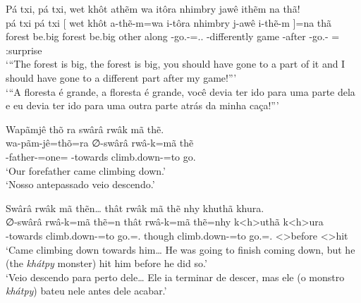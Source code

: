 \documentclass[output=paper,
modfonts,nonflat
]{langsci/langscibook}
\begin{document}
\ea  Pá txi, pá txi, wet khôt athẽm wa itôra nhimbry jawê ithẽm na thã! \\[.3em]
\gll pá     txi    pá     txi    [\footnotemark{} wet   khôt  a-thẽ-m=wa                               i-tôra             nhimbry j-awê    i-thẽ-m               ]=na        thã            \\
     forest be.big forest be.big {}               other along \Second-go.\Sg-\Nmlz{}=\AAnd.\Ds.\First{} \First-differently game    \E-after \First-go.\Sg-\Nmlz{} {}=\N\Fut{} \Intj:surprise \\
\glt `{}``The forest is big, the forest is big, you should have gone to a part of it and I should have gone to a different part after my game!''{}' \\
     `{}``A floresta é grande, a floresta é grande, você devia ter ido para uma parte dela e eu devia ter ido para uma outra parte atrás da minha caça!''{}' \\
\z

\ea  Wapãmjê thõ ra swârâ rwâk mã thẽ. \\[.3em]
\gll wa-pãm-jê=thõ=ra                                   ∅-swârâ        rwâ-k=mã              thẽ      \\
     \First\Incl\footnotemark{}-father-\Pl{}=one=\Nom{} \Third-towards climb.down-\Nmlz{}=to go.\Sg{} \\
\glt `Our  forefather came climbing down.' \\
     `Nosso antepassado veio descendo.' \\
\label{exe:switch-to-inclusive}
\z

\ea  Swârâ rwâk mã thẽn\ldots{} thât rwâk mã thẽ nhy khuthã khura. \\[.3em]
\gll ∅-swârâ        rwâ-k=mã              thẽ=n             thât   rwâ-k=mã              thẽ=nhy             k<h>uthã       k<h>ura     \\
     \Third-towards climb.down-\Nmlz{}=to go.\Sg=\AAnd.\Ss{} though climb.down-\Nmlz{}=to go.\Sg{}=\AAnd.\Ds{} <\Third>before <\Third>hit \\
\glt `Came climbing down towards him\ldots{} He was going to finish coming down, but he (the \textit{khátpy} monster) hit him before he did so.' \\
     `Veio descendo para perto dele\ldots{} Ele ia terminar de descer, mas ele (o monstro \textit{khátpy}) bateu nele antes dele acabar.' \\
\z
\end{document}
